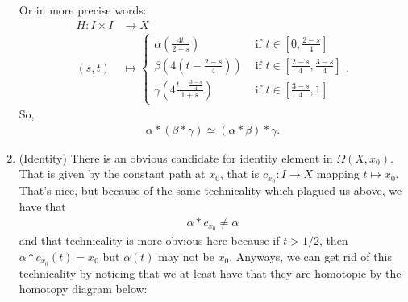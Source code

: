 \documentclass[letterpaper,11pt,twoside]{article}
\theoremstyle{definition}
\theoremstyle{definition}
\theoremstyle{definition}
\theoremstyle{definition}
\theoremstyle{definition}
\theoremstyle{definition}
\theoremstyle{remark}
\theoremstyle{definition}
\newcommand{\loops}[1]{\Omega\left(#1\right)}
\begin{document}
\begin{enumerate}
{\begin{figure}[h!]
\begin{center}
\begin{tikzpicture}[x=0.75pt,y=0.75pt,yscale=-1,xscale=1]
\end{tikzpicture}
\end{center}
\end{figure}

	    Or in more precise words: 
	    \begin{align*}
	        H : I\times I &\longrightarrow X\\
	        (s,t) &\longmapsto \begin{cases}
	            \alpha\left(\frac{4t}{2-s}\right) &\text{ if } t\in \left[ 0, \frac{2-s}{4} \right]\\
	            \beta\left( 4\left(t-\frac{2-s}{4}\right)  \right) &\text{ if }t\in \left[\frac{2-s}{4}, \frac{3-s}{4}\right]\\
	            \gamma\left( 4\frac{t - \frac{3-s}{4}}{1+s} \right)&\text{ if }t\in \left[\frac{3-s}{4},1\right]
	        \end{cases}.
	    \end{align*}
	    So, 
	   \begin{align*}
	    \alpha*(\beta*\gamma) \simeq (\alpha*\beta)*\gamma.
	    \end{align*}
	    }
	    \item{(Identity) There is an obvious candidate for identity element in $\loops{X,x_0}$. That is given by the constant path at $x_0$, that is $c_{x_0} : I \to X$ mapping $t\mapsto x_0$. That's nice, but because of the same technicality which plagued us above, we have that
	    \begin{align*}
	        \alpha * c_{x_0} \neq \alpha
	    \end{align*}
	    and that technicality is more obvious here because if $t> 1/2$, then $\alpha* c_{x_0} (t) = x_0$ but  $\alpha(t) $ may not be $x_0$. Anyways, we can get rid of this technicality by noticing that we at-least have that they are homotopic by the homotopy diagram below:
	    


\begin{figure}[h!]
\begin{center}



\begin{tikzpicture}[x=0.75pt,y=0.75pt,yscale=-1,xscale=1]


\end{tikzpicture}
\end{center}
\end{figure}}
\end{enumerate}
\end{document}
